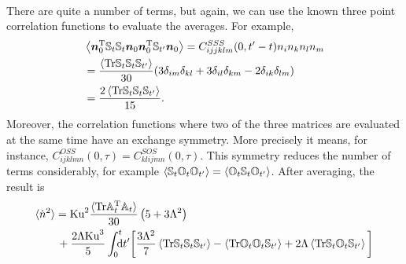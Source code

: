 \documentclass[thesis.tex]{subfiles}
\begin{document}
\begin{align*}
\end{align*}
There are quite a number of terms, but again, we can use the known three point correlation functions
 to evaluate the averages. For example, 
\begin{align*}
	&\left\langle\mbox{\boldmath$n$}_0^{\mathrm T}\mathbb{S}_t\mathbb{S}_t \mbox{\boldmath$n$}_0 \mbox{\boldmath$n$}_{0}^{\mathrm T}\mathbb{S}_{t'}\mbox{\boldmath$n$}_{0} \right\rangle
	= C^{SSS}_{ijjklm}(0, t'-t)n_in_kn_ln_m \\
	&= \frac{\left\langle\mbox{Tr} \mathbb{S}_t\mathbb{S}_{t}\mathbb{S}_{t'}\right\rangle}{30} (3 \delta_{im} \delta_{kl}+3 \delta_{il} \delta_{km}-2 \delta_{ik} \delta_{lm})\\
	&= \frac{2\left\langle\mbox{Tr} \mathbb{S}_t\mathbb{S}_{t}\mathbb{S}_{t'}\right\rangle}{15}.
\end{align*}
Moreover, the correlation functions where two of the three matrices are evaluated at the same time have an exchange symmetry. More precisely it means, for instance, $C^{OSS}_{ijklmn}(0,\tau)=C^{SOS}_{klijmn}(0,\tau)$. This symmetry reduces the number of terms considerably, for example $\langle \mathbb{S}_t \mathbb{O}_t \mathbb{O}_{t'}\rangle = \langle \mathbb{O}_t \mathbb{S}_t \mathbb{O}_{t'}\rangle$. After averaging, the result is
\begin{align*}
\langle \dot n^2\rangle &=\mbox{Ku}^2\frac{\langle\mbox{Tr}\mathbb{A}_t^{\mathrm T} \mathbb{A}_t\rangle}{30}\left(5 + 3 \Lambda^2\right) \\
	&\,+ \frac{2 \Lambda \mbox{Ku}^3}{5} \int_0^{t}\!\!\!\!{\rm d}t' \bigg[\frac{3 \Lambda^2}{7}\left\langle\mbox{Tr} \mathbb{S}_t\mathbb{S}_{t}\mathbb{S}_{t'}\right\rangle - \left\langle\mbox{Tr} \mathbb{O}_t\mathbb{O}_{t}\mathbb{S}_{t'}\right\rangle + 2 \Lambda \left\langle\mbox{Tr} \mathbb{S}_t\mathbb{O}_{t}\mathbb{S}_{t'}\right\rangle\bigg]
\end{align*}
\end{document}
